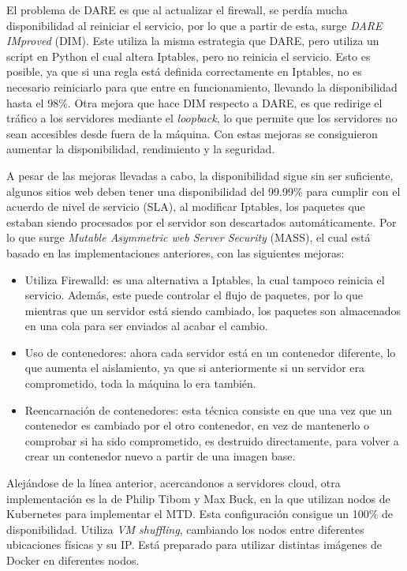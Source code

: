 El problema de DARE es que al actualizar el firewall, se perdía mucha disponibilidad al reiniciar el servicio, por lo que a partir de esta, surge \textit{DARE IMproved} (DIM)\cite{DIM}. Este utiliza la misma estrategia que DARE, pero utiliza un script en Python el cual altera Iptables, pero no reinicia el servicio. Esto es posible, ya que si una regla está definida correctamente en Iptables, no es necesario reiniciarlo para que entre en funcionamiento, llevando la disponibilidad hasta el 98\%. Otra mejora que hace DIM respecto a DARE, es que redirige el tráfico a los servidores mediante el \textit{loopback}, lo que permite que los servidores no sean accesibles desde fuera de la máquina. Con estas mejoras se consiguieron aumentar la disponibilidad, rendimiento y la seguridad.

A pesar de las mejoras llevadas a cabo, la disponibilidad sigue sin ser suficiente, algunos sitios web deben tener una disponibilidad del 99.99\% para cumplir con el acuerdo de nivel de servicio (SLA)\cite{SLA}, al modificar Iptables, los paquetes que estaban siendo procesados por el servidor son descartados automáticamente. Por lo que surge \textit{Mutable Asymmetric web Server Security} (MASS)\cite{MTD-DARE-DIM-MASS}, el cual está basado en las implementaciones anteriores, con las siguientes mejoras:
\begin{itemize}
    \item Utiliza Firewalld\cite{firewalld}: es una alternativa a Iptables, la cual tampoco reinicia el servicio. Además, este puede controlar el flujo de paquetes, por lo que mientras que un servidor está siendo cambiado, los paquetes son almacenados en una cola para ser enviados al acabar el cambio.
    \item Uso de contenedores: ahora cada servidor está en un contenedor diferente, lo que aumenta el aislamiento, ya que si anteriormente si un servidor era comprometido, toda la máquina lo era también.
    \item Reencarnación de contenedores: esta técnica consiste en que una vez que un contenedor es cambiado por el otro contenedor, en vez de mantenerlo o comprobar si ha sido comprometido, es destruido directamente, para volver a crear un contenedor nuevo a partir de una imagen base.
\end{itemize}

Alejándose de la línea anterior, acercandonos a servidores cloud, otra implementación es la de Philip Tibom y Max Buck\cite{MTD-gotemburgo}, en la que utilizan nodos de Kubernetes\cite{kubernetes} para implementar el MTD. Esta configuración consigue un 100\% de disponibilidad. Utiliza \textit{VM shuffling}, cambiando los nodos entre diferentes ubicaciones físicas y su IP. Está preparado para utilizar distintas imágenes de Docker en diferentes nodos.

